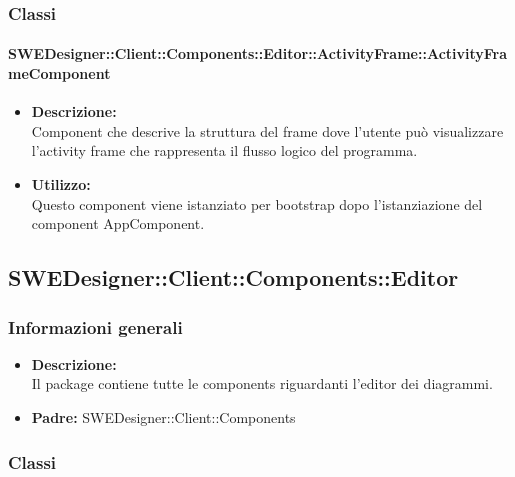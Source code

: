 		\subsubsection{Classi}
			\paragraph{SWEDesigner::Client::Components::Editor::ActivityFrame::ActivityFrameComponent}
				\begin{itemize}
          			\item \textbf{Descrizione:}\\
          			Component che descrive la struttura del frame dove l’utente può visualizzare l’activity frame che rappresenta il flusso logico del programma.
          			\item \textbf{Utilizzo:}\\
          			Questo component viene istanziato per bootstrap dopo l’istanziazione del component AppComponent.\
          		\end{itemize}
	\subsection{SWEDesigner::Client::Components::Editor}
		\subsubsection{Informazioni generali}
			\begin{itemize}
          		\item \textbf{Descrizione:}\\
          		Il package contiene tutte le components riguardanti l’editor dei diagrammi.
          		\item \textbf{Padre:} SWEDesigner::Client::Components
          	\end{itemize}
		\subsubsection{Classi}
